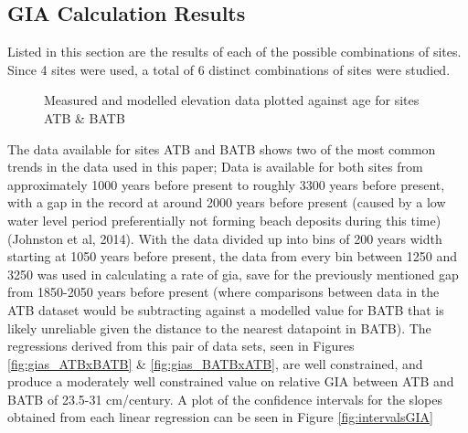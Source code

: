 

\subsection{GIA Calculation Results}



Listed in this section are the results of each of the possible combinations of sites.
Since 4 sites were used, a total of 6 distinct combinations of sites were studied.


\begin{figure}[h]
	\caption{Measured and modelled elevation data plotted against age for sites ATB \& BATB}
	\label{fig:data_ATBxBATB}
\end{figure}
The data available for sites ATB and BATB shows two of the most common trends in
 the data used in this paper; Data is available for both sites from
 approximately 1000 years before present to roughly 3300 years before present,
 with a gap in the record at around 2000 years before present (caused by a low
 water level period preferentially not forming beach deposits during this time)
 (Johnston et al, 2014). With the data divided up into bins of 200 years width
 starting at 1050 years before present, the data from every bin between 1250 and 3250 was used
 in calculating a rate of gia, save for the previously mentioned gap from 1850-2050
 years before present (where comparisons between data in the ATB dataset would be
 subtracting against a modelled value for BATB that is likely unreliable given
 the distance to the nearest datapoint in BATB). The regressions derived from this pair of data sets,
 seen in Figures \ref{fig:gias_ATBxBATB} \& \ref{fig:gias_BATBxATB}, are well
 constrained, and produce a moderately well constrained value on relative GIA
 between ATB and BATB of 23.5-31 cm/century. A plot of the confidence intervals
 for the slopes obtained from each linear regression can be seen in Figure \ref{fig:intervalsGIA}


